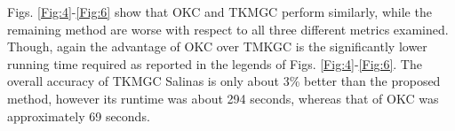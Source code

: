\documentclass[10pt,final]{IEEEtran}
\begin{document}
Figs. \ref{Fig:4}-\ref{Fig:6} show that OKC and  TKMGC perform similarly, while the remaining method are worse with respect to all three different metrics examined. Though, again the advantage of OKC over TMKGC is the significantly lower running time required as reported in the legends of Figs. \ref{Fig:4}-\ref{Fig:6}. The overall accuracy of TKMGC Salinas is only about 3\% better than the proposed method, however its runtime was about 294 seconds, whereas that of OKC was approximately 69 seconds. %
\end{document}

